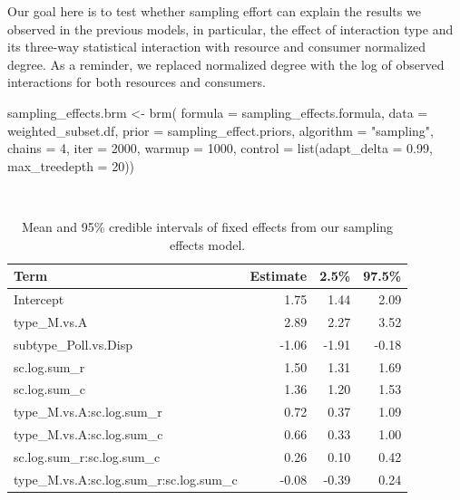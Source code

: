 \documentclass[11pt,]{article}
\newenvironment{Shaded}{}{}
\newcommand{\KeywordTok}[1]{\textcolor[rgb]{0.00,0.00,1.00}{#1}}
\newcommand{\DataTypeTok}[1]{#1}
\newcommand{\DecValTok}[1]{#1}
\newcommand{\FloatTok}[1]{#1}
\newcommand{\StringTok}[1]{\textcolor[rgb]{0.00,0.50,0.50}{#1}}
\newcommand{\NormalTok}[1]{#1}
\begin{document}
Our goal here is to test whether sampling effort can explain the results
we observed in the previous models, in particular, the effect of
interaction type and its three-way statistical interaction with resource
and consumer normalized degree. As a reminder, we replaced normalized
degree with the log of observed interactions for both resources and
consumers.

\begin{Shaded}
\begin{Highlighting}[]
\NormalTok{sampling_effects.brm <-}\StringTok{ }\KeywordTok{brm}\NormalTok{(}
  \DataTypeTok{formula =}\NormalTok{ sampling_effects.formula, }\DataTypeTok{data =}\NormalTok{ weighted_subset.df, }
  \DataTypeTok{prior =}\NormalTok{ sampling_effect.priors, }\DataTypeTok{algorithm =} \StringTok{"sampling"}\NormalTok{, }
  \DataTypeTok{chains =} \DecValTok{4}\NormalTok{, }\DataTypeTok{iter =} \DecValTok{2000}\NormalTok{, }\DataTypeTok{warmup =} \DecValTok{1000}\NormalTok{,}
  \DataTypeTok{control =} \KeywordTok{list}\NormalTok{(}\DataTypeTok{adapt_delta =} \FloatTok{0.99}\NormalTok{, }\DataTypeTok{max_treedepth =} \DecValTok{20}\NormalTok{))}
\end{Highlighting}
\end{Shaded}

~

\begin{table}[!h]

\caption{\label{tab:sampling-table}Mean and 95\% credible intervals of fixed effects from our sampling effects model.}
\centering
\begin{tabular}{lrrr}
\toprule
Term & Estimate & 2.5\% & 97.5\%\\
\midrule
\rowcolor{gray!6}  Intercept & 1.75 & 1.44 & 2.09\\
type\_M.vs.A & 2.89 & 2.27 & 3.52\\
\rowcolor{gray!6}  subtype\_Poll.vs.Disp & -1.06 & -1.91 & -0.18\\
sc.log.sum\_r & 1.50 & 1.31 & 1.69\\
\rowcolor{gray!6}  sc.log.sum\_c & 1.36 & 1.20 & 1.53\\
\addlinespace
type\_M.vs.A:sc.log.sum\_r & 0.72 & 0.37 & 1.09\\
\rowcolor{gray!6}  type\_M.vs.A:sc.log.sum\_c & 0.66 & 0.33 & 1.00\\
sc.log.sum\_r:sc.log.sum\_c & 0.26 & 0.10 & 0.42\\
\rowcolor{gray!6}  type\_M.vs.A:sc.log.sum\_r:sc.log.sum\_c & -0.08 & -0.39 & 0.24\\
\bottomrule
\end{tabular}
\end{table}
\end{document}
